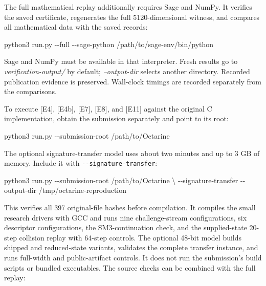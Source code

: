 \documentclass[
  american,
  10pt,
  a4paper,
]{article}
\newenvironment{Shaded}{}{}
\newcommand{\AttributeTok}[1]{\textcolor[rgb]{0.49,0.56,0.16}{#1}}
\newcommand{\DataTypeTok}[1]{\textcolor[rgb]{0.56,0.13,0.00}{#1}}
\newcommand{\ExtensionTok}[1]{#1}
\newcommand{\NormalTok}[1]{#1}
\begin{document}
The full mathematical replay additionally requires Sage and NumPy. It
verifies the saved certificate, regenerates the full 5120-dimensional
witness, and compares all mathematical data with the saved records:

\begin{Shaded}
\begin{Highlighting}[]
\ExtensionTok{python3}\NormalTok{ run.py }\AttributeTok{{-}{-}full} \AttributeTok{{-}{-}sage{-}python}\NormalTok{ /path/to/sage{-}env/bin/python}
\end{Highlighting}
\end{Shaded}

Sage and NumPy must be available in that interpreter. Fresh results go
to \emph{verification-output/} by default; \emph{--output-dir} selects
another directory. Recorded publication evidence is preserved.
Wall-clock timings are recorded separately from the comparisons.

To execute {[}E4{]}, {[}E4b{]}, {[}E7{]}, {[}E8{]}, and {[}E11{]}
against the original C implementation, obtain the submission separately
and point to its root:

\begin{Shaded}
\begin{Highlighting}[]
\ExtensionTok{python3}\NormalTok{ run.py }\AttributeTok{{-}{-}submission{-}root}\NormalTok{ /path/to/Octarine}
\end{Highlighting}
\end{Shaded}

The optional signature-transfer model uses about two minutes and up to 3
GB of memory. Include it with \texttt{-\/-signature-transfer}:

\begin{Shaded}
\begin{Highlighting}[]
\ExtensionTok{python3}\NormalTok{ run.py }\AttributeTok{{-}{-}submission{-}root}\NormalTok{ /path/to/Octarine }\DataTypeTok{\textbackslash{}}
  \AttributeTok{{-}{-}signature{-}transfer} \AttributeTok{{-}{-}output{-}dir}\NormalTok{ /tmp/octarine{-}reproduction}
\end{Highlighting}
\end{Shaded}

This verifies all 397 original-file hashes before compilation. It
compiles the small research drivers with GCC and runs nine
challenge-stream configurations, six descriptor configurations, the
SM3-continuation check, and the supplied-state 20-step collision replay
with 64-step controls. The optional 48-bit model builds shipped and
reduced-state variants, validates the complete transfer instance, and
runs full-width and public-artifact controls. It does not run the
submission's build scripts or bundled executables. The source checks can
be combined with the full replay:
\end{document}

